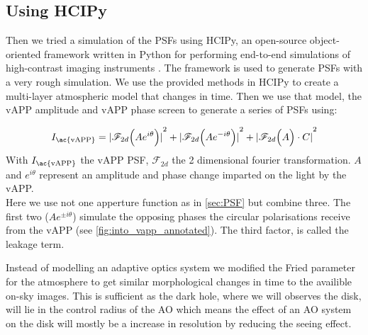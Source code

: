 \subsection{Using HCIPy}
\label{sec:hcipy}
Then we tried a simulation of the  \acp{PSF} using \ac{HCIPy}, an open-source object-oriented framework written in Python for performing end-to-end simulations of high-contrast imaging instruments \cite{hcipy}. The framework is used to generate \acp{PSF} with a very rough simulation. We use the provided methods in \ac{HCIPy} to create a multi-layer atmospheric model that changes in time. Then we use that model, the \ac{vAPP} amplitude and \ac{vAPP} phase screen to generate a series of \acp{PSF} using:

\begin{equation}
I_\text{\ac{vAPP}} = {\mathopen| \mathscr{F}_{2d}\Big( Ae^{i\theta}\Big) \mathclose|}^2 + {\mathopen| \mathscr{F}_{2d}\Big( Ae^{-i\theta}\Big) \mathclose|}^2 + {\mathopen| \mathscr{F}_{2d}\Big( A \Big) \cdot C \mathclose|}^2
\end{equation}
With $I_\text{\ac{vAPP}}$ the \ac{vAPP} \ac{PSF}, $\mathscr{F}_{2d}$ the 2 dimensional fourier transformation. $A$ and $e^{i\theta}$ represent an amplitude and phase change imparted on the light by the \ac{vAPP}.\\

Here we use not one apperture function as in \autoref{sec:PSF} but combine three. The first two ($Ae^{\pm i\theta}$) simulate the opposing phases the circular polarisations receive from the \ac{vAPP} (see \autoref{fig:into_vapp_annotated}). The third factor, is called the leakage term.

Instead of modelling an adaptive optics system we modified the Fried parameter for the atmosphere to get similar morphological changes in time to the availible on-sky images. This is sufficient as the dark hole, where we will observes the disk, will lie in the control radius of the \ac{AO} which means the effect of an \ac{AO} system on the disk will mostly be a increase in resolution by reducing the seeing effect.

